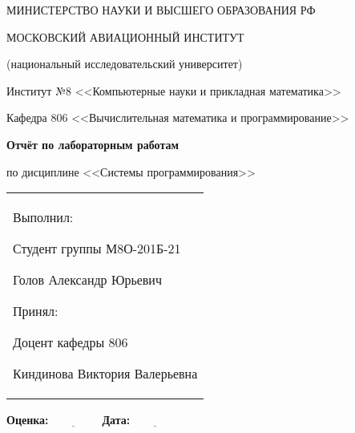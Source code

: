 \begin{titlepage}
		\thispagestyle{specialfooter}
		
		\begin{center}
				МИНИСТЕРСТВО НАУКИ И ВЫСШЕГО ОБРАЗОВАНИЯ РФ
		
		\vspace{1cm}
		
		МОСКОВСКИЙ АВИАЦИОННЫЙ ИНСТИТУТ
		\par
		(национальный исследовательский университет)
		
		\vspace{1cm}
		
		Институт №8 <<Компьютерные науки и прикладная математика>>
		
		\par
		\vspace{1cm}
		
		Кафедра 806 <<Вычислительная математика и программирование>>
			
			\vfill
			
			{\Large \textbf{Отчёт по лабораторным работам}}
			\vspace{0.5cm}
			\par
			по дисциплине <<Системы программирования>>

		\end{center}
		
		\vfill
		
		\begin{minipage}{0.45\textwidth}
			
		\end{minipage}%
		\hfill
		\begin{minipage}{0.5\textwidth}
			\begin{tabular}{p{\textwidth}}
				\raggedright 
				Выполнил:
				\par
				Студент группы М8О-201Б-21
				\par
				Голов Александр Юрьевич
				\par
				\vspace{0.5cm}
				Принял:
				\par
				Доцент кафедры 806
				\par
				Киндинова Виктория Валерьевна
			\end{tabular}
		\end{minipage}%
		
		\vspace{2cm}
		
				\textbf{Оценка:$\underline{\; \; \; \; \; \; \; \; \; \; \; \; \; \; \; \;}$} \hfill \textbf{Дата:$\underline{\; \; \; \; \; \; \; \; \; \; \; \; \; \; \; \;}$}
		
		
\end{titlepage}